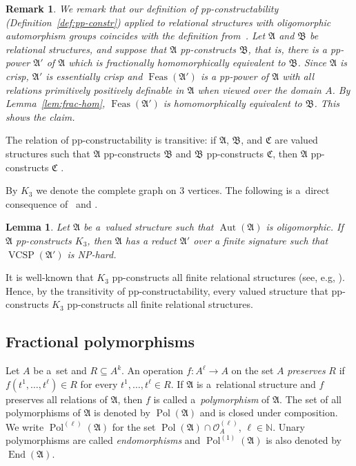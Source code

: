 \documentclass[preprint,12pt]{elsarticle}
\newcommand{\N}{\mathbb N}
\newcommand{\bA}{{\mathfrak A}}
\newcommand{\bB}{{\mathfrak B}}
\newcommand{\bC}{{\mathfrak C}}
\DeclareMathOperator{\Aut}{Aut}
\DeclareMathOperator{\End}{End}
\DeclareMathOperator{\vcsp}{VCSP}
\DeclareMathOperator{\Pol}{Pol}
\DeclareMathOperator{\Feas}{Feas}
\newtheorem{lemma}[theorem]{Lemma}
\newtheorem{remark}[theorem]{Remark}
\begin{document}
\begin{remark}
We remark that our definition of pp-constructability (Definition~\ref{def:pp-constr}) applied to relational structures with oligomorphic automorphism groups coincides with the definition from~\cite{wonderland}. Let $\bA$ and $\bB$ be relational structures, and suppose that $\bA$ pp-constructs $\bB$, that is, there is a pp-power $\bA'$ of $\bA$ which is fractionally homomorphically equivalent to $\bB$.
Since $\bA$ is crisp, $\bA'$ is essentially crisp and $\Feas(\bA')$ is a pp-power of $\bA$ with all relations primitively positively definable in $\bA$ when viewed over the domain $A$. By Lemma~\ref{lem:frac-hom}, $\Feas(\bA')$ is homomorphically equivalent to $\bB$. 
This shows the claim. 
\end{remark}
The relation of pp-constructability is transitive: if $\bA$, $\bB$, and $\bC$ are valued structures such that $\bA$ pp-constructs $\bB$ and $\bB$ pp-constructs $\bC$, then $\bA$ pp-constructs $\bC$ \cite[Lemma 5.14]{Resilience-VCSPs}.

By $K_3$ we denote the complete graph on $3$ vertices.
The following is a~direct consequence of~\cite[Corollary 5.13]{Resilience-VCSPs} and \cite[Corollary 6.7.13]{Book}.
\begin{lemma}\label{lem:hard} 
Let $\bA$ be a~valued structure such that $\Aut(\bA)$ is oligomorphic. If $\bA$ pp-constructs $K_3$, then $\bA$ has a reduct $\bA'$ over a finite signature such that $\vcsp(\bA')$ is NP-hard.
\end{lemma} 

It is well-known that $K_3$ pp-constructs all finite relational structures (see, e.g, \cite[Corollary 6.4.4]{Book}). Hence, by the transitivity of pp-constructability, every valued structure that pp-constructs $K_3$ pp-constructs all finite relational structures. 

\subsection{Fractional polymorphisms}
Let $A$ be a~set and $R \subseteq A^k$. An operation $f \colon A^\ell \to A$ on the set $A$ \emph{preserves} $R$ if $f(t^1, \dots, t^\ell) \in R$ for every
$t^1,\dots, t^\ell \in R$.
If $\bA$ is a~relational structure and $f$ preserves all relations of $\bA$, then $f$ is called a~\emph{polymorphism} of $\bA$. The set of all polymorphisms of $\bA$ is denoted by $\Pol(\bA)$ and is closed under composition. We write $\Pol^{(\ell)}(\bA)$ for the set $\Pol(\bA) \cap \mathscr{O}_A^{(\ell)}$, $\ell \in \N$. Unary polymorphisms are called \emph{endomorphisms} and $\Pol^{(1)}(\bA)$ is also denoted by $\End(\bA)$. 
\end{document}
